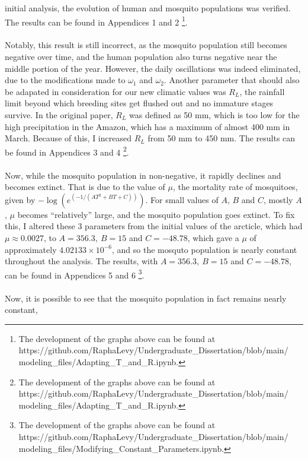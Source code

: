 initial analysis, the evolution of human and mosquito populations 
was verified.  
The results can be found in Appendices 1 and 2 
\footnote{The development of the graphs above can be found at 
https://github.com/RaphaLevy/Undergraduate\_Dissertation/blob/main/
\\modeling\_files/Adapting\_T\_and\_R.ipynb.}. 
\\\\
Notably, this result is still incorrect, as the mosquito population
still becomes negative over time, and the human population also turns negative
near the middle portion of the year. 
However, the daily oscillations
was indeed eliminated, due to the modifications made to $\omega_1$ and $\omega_2$.
Another parameter that should also be adapated in consideration for our new climatic
values was $R_L$, the rainfall limit beyond which breeding sites get flushed out and no 
immature stages survive. In the original paper, $R_L$ was defined as 50 mm, which is
too low for the high precipitation in the Amazon, which has a maximum of almost
400 mm in March. Because of this, I increased $R_L$ from 50 mm to 450 mm.
The results can be found in Appendices 3 and 4 
\footnote{The development of the graphs above can be found at 
https://github.com/RaphaLevy/Undergraduate\_Dissertation/blob/main/
\\modeling\_files/Adapting\_T\_and\_R.ipynb.}.
\\\\
Now, while the mosquito population in non-negative, it rapidly declines and
becomes extinct. That is due to the value of $\mu$, the mortality rate of mosquitoes,
given by $-\log(e^{(-1 / (AT^2 + BT + C))})$. For small values of 
$A$, $B$ and $C$, mostly $A$, $\mu$ becomes ``relatively'' large, and the mosquito
population goes extinct. To fix this, I altered these 3 parameters from the initial values 
of the arcticle, which had $\mu \approx 0.0027$, to $A=356.3, \ B=15$
and $C=-48.78$, which gave a $\mu$ of approximately $4.02133 \times 10^{-6}$, 
and so the mosquto population is nearly constant throughout the analysis.
The results, with $A=356.3, \ B=15$
and $C=-48.78$, can be found in Appendices 5 and 6 
\footnote{The development of the graphs above can be found at 
https://github.com/RaphaLevy/Undergraduate\_Dissertation/blob/main/
\\modeling\_files/Modifying\_Constant\_Parameters.ipynb.}.
\\\\
Now, it is possible to see that the mosquito population in fact remains nearly constant,
